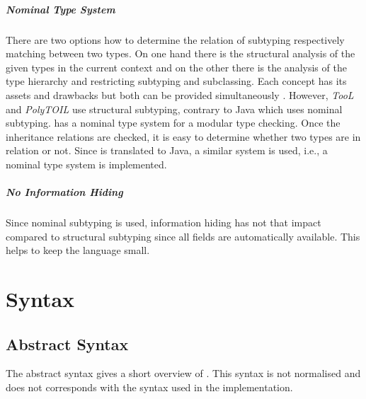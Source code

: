\paragraph{Nominal Type System}
There are two options how to determine the relation of subtyping
respectively matching between two types. On one hand there is the structural
analysis of the given types in the current context and on the other there
is the analysis of the type hierarchy and restricting subtyping and
subclassing. Each concept has its assets and drawbacks but both can
be provided simultaneously \cite{malayeri_integrating_2008}. However,
\emph{TooL} and \emph{PolyTOIL} use structural subtyping, contrary to
Java which uses nominal subtyping. \ooplss has a nominal type system
for a modular type checking. Once the inheritance relations are checked,
it is easy to determine whether two types are in relation or not. Since
\ooplss is translated to Java, a similar system is used, i.e., a nominal
type system is implemented.

\paragraph{No Information Hiding}
Since nominal subtyping is used, information hiding has not that impact
compared to structural subtyping since all fields are automatically
available. This helps to keep the language small.

\chapter{Syntax}
\section{Abstract Syntax}
The abstract syntax gives a short overview of \ooplss. This syntax is
not normalised and does not corresponds with the syntax used in the
implementation.\\

